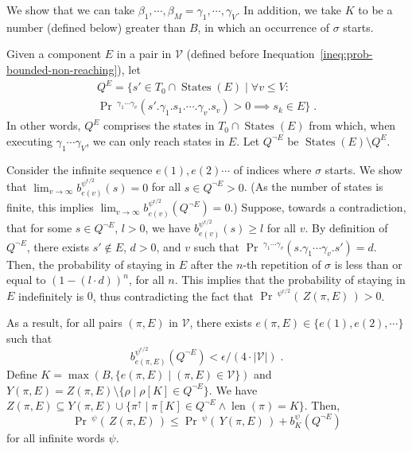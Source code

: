 \documentclass[final,3p,times,twocolumn]{elsarticle}
\theoremstyle{plain}
\theoremstyle{definition}
\newcommand{\state}{s}
\newcommand{\fpath}{\pi}
\newcommand{\ipath}{\rho}
\newcommand{\extension}[1]{{#1}^{\uparrow}}
\DeclareMathOperator{\lenWord}{len}
\newcommand{\len}[1]{\lenWord({#1})}
\newcommand{\iword}{\psi}
\DeclareMathOperator{\prWord}{Pr}
\newcommand{\recallInequation}[1]{Inequation~\ref{#1}}
\newcommand{\st}{\mid}
\newcommand{\iwordeps}{\iword^{\epsilon/2}}
\newcommand{\qsep}{:}
\newcommand{\belief}[3]{b^{#1}_{#2}({#3})}
\newcommand{\card}[1]{|{#1}|}
\newcommand{\sequ}{\sigma}
\DeclareMathOperator{\statesWord}{States}
\newcommand{\stec}[1]{\statesWord({#1})}
\newcommand{\pr}{\prWord\,\!}
\begin{document}
We show that we can take
$\beta_{1}, \cdots, \beta_{M}
		= \gamma_{1}, \cdots, \gamma_{V}$.
In addition, we take $K$ to be a number (defined below) greater than $B$, in
which an occurrence of $\sequ$ starts.

Given a component $E$ in a pair in $\mathcal{V}$ (defined before
\recallInequation{ineq:prob-bounded-non-reaching}), let
\begin{multline*}
Q^{E} =
	\{ \state' \in T_{0} \cap \stec{E} \st \forall v \leq V \qsep \\
				\pr^{\gamma_{1} \cdots \gamma_{v}}
				(\state'.\gamma_{1}.\state_{1}.\cdots.\gamma_{v}.\state_{v})
																	> 0
					\implies \state_{k} \in E \} \; .
\end{multline*}
In other words, $Q^{E}$ comprises the states in $T_{0} \cap \stec{E}$ from
which, when executing $\gamma_{1} \cdots \gamma_{V}$, we can only reach states
in $E$. Let $Q^{\lnot E}$ be $\stec{E} \setminus Q^{E}$.

Consider the infinite sequence
$e(1), e(2) \cdots$ of indices where $\sequ$ starts. We show that
$\lim_{v \to \infty} \belief{\iwordeps}{e(v)}{\state} = 0$ for all
$\state \in Q^{\lnot E} > 0$. (As the number of states is finite, this implies
$\lim_{v \to \infty} \belief{\iwordeps}{e(v)}{Q^{\lnot E}} = 0$.)
Suppose, towards a contradiction, that for some $s \in Q^{\lnot E}$, $l > 0$,
we have $\belief{\iwordeps}{e(v)}{s} \geq l$ for all $v$. By definition of
$Q^{\lnot E}$, there exists $\state' \not\in E$, $d > 0$, and $v$ such that
$\pr^{\gamma_{1} \cdots \gamma_{v}}
				(\state.\gamma_{1} \cdots \gamma_{v}.\state')
													= d$. Then, the
probability of staying in $E$ after the $n$-th repetition of $\sequ$ is
less than or equal to $(1-(l \cdot d))^{n}$, for all $n$. This implies that the
probability of staying in $E$ indefinitely is $0$, thus contradicting the fact
that $\pr^{\iwordeps}(\, Z(\fpath,E) \,) > 0$.

As a result, for all pairs $(\fpath,E)$ in $\mathcal{V}$, there exists
$e(\fpath,E) \in \{ e(1), e(2), \cdots \}$ such that
\begin{equation}
\label{ineq:escape-small}
\belief{\iwordeps}{e(\fpath,E)}{Q^{\lnot E}}
							< \epsilon/(4 \cdot \card{\mathcal{V}}) \; .
\end{equation}
Define
$K = \max(B , \{ e(\fpath,E) \st (\fpath,E) \in \mathcal{V} \})$
and 
$Y(\fpath,E) = Z(\fpath,E) \setminus
			\{ \ipath \st \ipath[K] \in Q^{\lnot E} \}$.
We have
$Z(\fpath,E) \subseteq Y(\fpath,E) \cup
				\{ \extension{\fpath} \st \fpath[K] \in Q^{\lnot E}
							\land \len{\fpath} = K \}$.
Then,
\begin{equation}
\label{ineq:bound-Z}
\pr^{\iword}(\, Z(\fpath,E) \,) \leq \pr^{\iword}(\, Y(\fpath,E) \,)
								+ \belief{\iword}{K}{Q^{\lnot E}}
\end{equation}
for all infinite words $\iword$.
\end{document}
